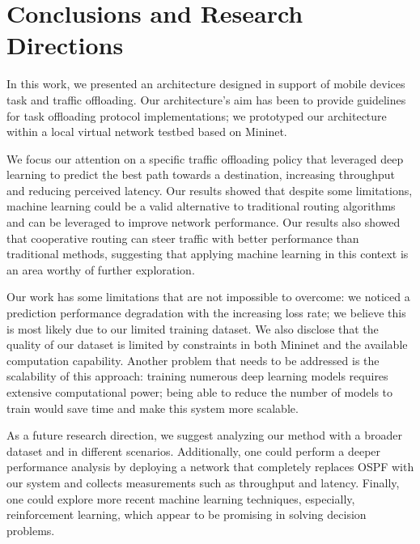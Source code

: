 \chapter{Conclusions and Research Directions}\label{ch:conclusion}

In this work, we presented an architecture designed in support of mobile devices task and traffic offloading. Our architecture's aim has been to provide guidelines for task offloading protocol implementations; we prototyped our architecture within a local virtual network testbed based on Mininet.

We focus our attention on a specific traffic offloading policy that leveraged deep learning to predict the best path towards a destination, increasing throughput and reducing perceived latency. Our results showed that despite some limitations, machine learning could be a valid alternative to traditional routing algorithms and can be leveraged to improve network performance. Our results also showed that cooperative routing can steer traffic with better performance than traditional methods, suggesting that applying machine learning in this context is an area worthy of further exploration. 

Our work has some limitations that are not impossible to overcome: we noticed a prediction performance degradation with the increasing loss rate; we believe this is most likely due to our limited training dataset. We also disclose that the quality of our dataset is limited by constraints in both Mininet and the available computation capability. Another problem that needs to be addressed  is the scalability of this approach: training numerous deep learning models requires extensive computational power; being able to reduce the number of models to train would save time and make this system more scalable.

As a future research direction, we suggest analyzing our method with a broader dataset and in different scenarios. Additionally, one could perform a deeper performance analysis by deploying a network that completely replaces OSPF with our system and collects measurements such as throughput and latency. Finally, one could explore more recent machine learning techniques, especially, reinforcement learning, which appear to be promising in solving decision problems.